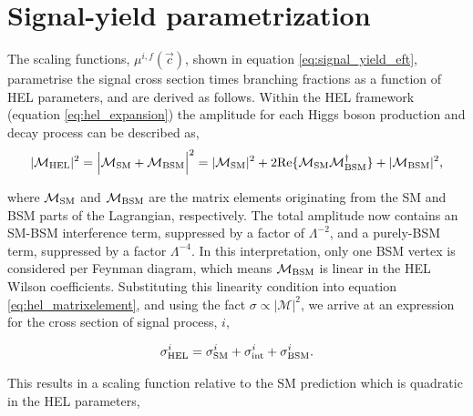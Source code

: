 
\section{Signal-yield parametrization}\label{sec:eft_parametrisation}
The scaling functions, $\mu^{i,f}(\vec{c})$, shown in equation \ref{eq:signal_yield_eft}, parametrise the signal cross section times branching fractions as a function of HEL parameters, and are derived as follows. Within the HEL framework (equation \ref{eq:hel_expansion}) the amplitude for each Higgs boson production and decay process can be described as,
\begin{equation}\label{eq:hel_matrixelement}
    |\mathcal{M}_{\rm{HEL}}|^2 = \Big| \mathcal{M}_{\rm{SM}} + \mathcal{M}_{\rm{BSM}} \Big|^2 = |\mathcal{M}_{\rm{SM}}|^2 + 2{\rm{Re}}\{\mathcal{M}_{\rm{SM}}\mathcal{M}^{\dagger}_{\rm{BSM}}\} + |\mathcal{M}_{\rm{BSM}}|^2,
\end{equation}

\noindent
where $\mathcal{M}_{\rm{SM}}$ and $\mathcal{M}_{\rm{BSM}}$ are the matrix elements originating from the SM and BSM parts of the Lagrangian, respectively. The total amplitude now contains an SM-BSM interference term, suppressed by a factor of $\Lambda^{-2}$, and a purely-BSM term, suppressed by a factor $\Lambda^{-4}$. In this interpretation, only one BSM vertex is considered per Feynman diagram, which means $\mathcal{M}_{\rm{BSM}}$ is linear in the HEL Wilson coefficients. Substituting this linearity condition into equation \ref{eq:hel_matrixelement}, and using the fact $\sigma \propto |\mathcal{M}|^2$, we arrive at an expression for the cross section of signal process, $i$,

\begin{equation}
    \sigma^i_{\rm{HEL}} = \sigma^i_{\rm{SM}} + \sigma^i_{\rm{int}} + \sigma^i_{\rm{BSM}}.
\end{equation}

\noindent
This results in a scaling function relative to the SM prediction which is quadratic in the HEL parameters,

